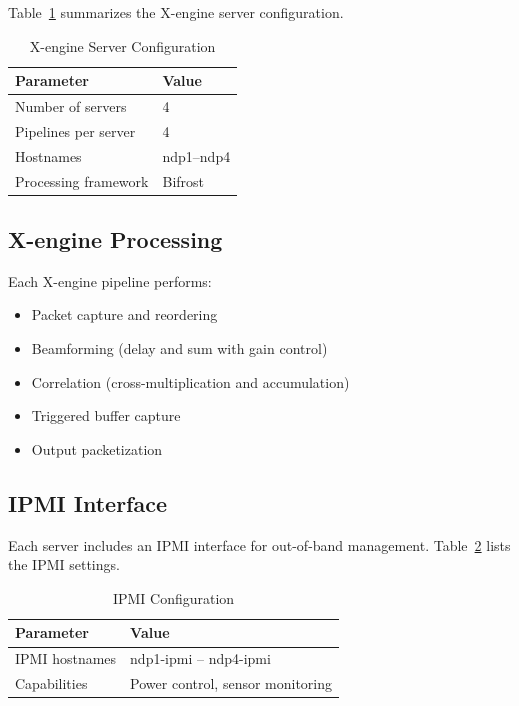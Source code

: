 Table~\ref{tab:xengine-config2} summarizes the X-engine server configuration.

\begin{table}[htbp]
    \centering
    \caption{X-engine Server Configuration}
    \label{tab:xengine-config2}
    \begin{tabular}{ll}
        \toprule
        \textbf{Parameter} & \textbf{Value} \\
        \midrule
        Number of servers & 4 \\
        Pipelines per server & 4 \\
        Hostnames & ndp1--ndp4 \\
        Processing framework & Bifrost \\
        \bottomrule
    \end{tabular}
\end{table}

\subsection{X-engine Processing}

Each X-engine pipeline performs:
\begin{itemize}
    \item Packet capture and reordering
    \item Beamforming (delay and sum with gain control)
    \item Correlation (cross-multiplication and accumulation)
    \item Triggered buffer capture
    \item Output packetization
\end{itemize}

\subsection{IPMI Interface}

Each server includes an IPMI interface for out-of-band management.  Table~\ref{tab:ipmi-config} lists the IPMI settings.

\begin{table}[htbp]
    \centering
    \caption{IPMI Configuration}
    \label{tab:ipmi-config}
    \begin{tabular}{ll}
        \toprule
        \textbf{Parameter} & \textbf{Value} \\
        \midrule
        IPMI hostnames & ndp1-ipmi -- ndp4-ipmi \\
        Capabilities & Power control, sensor monitoring \\
        \bottomrule
    \end{tabular}
\end{table}

